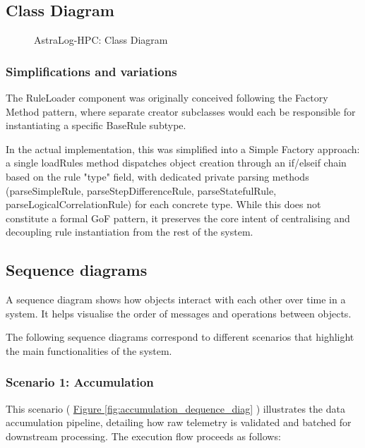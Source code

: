 \documentclass{article}
\newcommand{\figurerefer}[1]{%
    \hyperref[#1]{Figure \ref*{#1}}%
}
\begin{document}
\begin{landscape}
\subsection{Class Diagram}
\thispagestyle{landscapepage}
\begin{figure}[h]
    \centering
    
    \caption{AstraLog-HPC: Class Diagram}
    \label{fig:class_diag}
\end{figure}
\end{landscape}

\subsubsection{Simplifications and variations}
The RuleLoader component was originally conceived following the Factory Method pattern, where separate creator subclasses would each be responsible for instantiating a specific BaseRule subtype.

\medskip

In the actual implementation, this was simplified into a Simple Factory approach: a single loadRules method dispatches object creation through an if/elseif chain based on the rule "type" field, with dedicated private parsing methods (parseSimpleRule, parseStepDifferenceRule, parseStatefulRule, parseLogicalCorrelationRule) for each concrete type. While this does not constitute a formal GoF pattern, it preserves the core intent of centralising and decoupling rule instantiation from the rest of the system.

\subsection{Sequence diagrams}
A sequence diagram shows how objects interact with each other over time in a system. It helps visualise the order of messages and operations between objects.

\medskip
The following sequence diagrams correspond to different scenarios that highlight the main functionalities of the system.

\subsubsection{Scenario 1: Accumulation}
This scenario (\figurerefer{fig:accumulation_dequence_diag}) illustrates the data accumulation pipeline, detailing how raw telemetry is validated and batched for downstream processing. The execution flow proceeds as follows:
\end{document}
